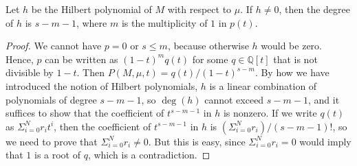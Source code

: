 \begin{theorem}
\label{Hildeg}
\leanok
Let $h$ be the Hilbert polynomial of $M$ with respect to $\mu$.  If $h\neq{0}$, then the degree of $h$ is $s-m-1$, where $m$ is the multiplicity of $1$ in $p(t)$.
\end{theorem}
\begin{proof}
We cannot have $p=0$ or $s\le{m}$, because otherwise $h$ would be zero. Hence, $p$ can be written as $(1-t)^{m}q(t)$ for some $q\in\mathbb{Q}[t]$ that is not divisible by $1-t$. Then $P(M,\mu,t)=q(t)/(1-t)^{s-m}$. By how we have introduced the notion of Hilbert polynomials, $h$ is a linear combination of polynomials of degree $s-m-1$, so $\operatorname{deg}(h)$ cannot exceed $s-m-1$, and it suffices to show that the coefficient of $t^{s-m-1}$ in $h$ is nonzero. If we write $q(t)$ as $\Sigma_{i=0}^Nr_it^i$, then the coefficient of $t^{s-m-1}$ in $h$ is $(\Sigma_{i=0}^N{r_i})/(s-m-1)!$, so we need to prove that $\Sigma_{i=0}^Nr_i\neq{0}$. But this is easy, since $\Sigma_{i=0}^Nr_i={0}$ would imply that $1$ is a root of $q$, which is a contradiction.
\end{proof}
